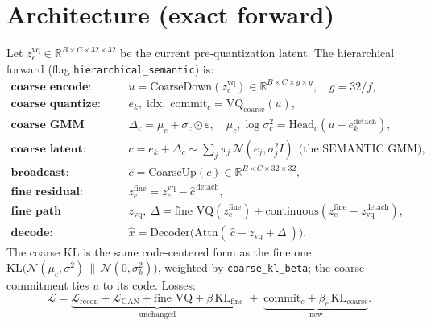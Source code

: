 \documentclass[11pt]{article}
\newcommand{\code}[1]{\texttt{#1}}
\begin{document}
\section{Architecture (exact forward)}
Let $z_e^{\text{vq}}\in\mathbb{R}^{B\times C\times 32\times 32}$ be the current pre-quantization latent.
The hierarchical forward (flag \code{hierarchical\_semantic}) is:
\begin{align}
\textbf{coarse encode:}\quad & u = \mathrm{CoarseDown}(z_e^{\text{vq}}) \in \mathbb{R}^{B\times C\times g\times g},\quad g=32/f,\\
\textbf{coarse quantize:}\quad & e_{k}, \;\text{idx},\;\text{commit}_c = \mathrm{VQ_{coarse}}(u),\\
\textbf{coarse GMM offset:}\quad & \Delta_c = \mu_c + \sigma_c\odot\varepsilon,\quad \mu_c,\log\sigma_c^2 = \mathrm{Head}_c(u-e_k^{\text{detach}}),\\
\textbf{coarse latent:}\quad & c = e_k + \Delta_c \sim \textstyle\sum_j \pi_j\,\mathcal{N}(e_j,\sigma_j^2 I)\ \ \text{(the SEMANTIC GMM)},\\
\textbf{broadcast:}\quad & \hat{c} = \mathrm{CoarseUp}(c) \in \mathbb{R}^{B\times C\times 32\times 32},\\
\textbf{fine residual:}\quad & z_e^{\text{fine}} = z_e^{\text{vq}} - \hat{c}^{\,\text{detach}},\\
\textbf{fine path (unchanged):}\quad & z_{\text{vq}},\ \Delta = \text{fine VQ}(z_e^{\text{fine}}) + \text{continuous}(z_e^{\text{fine}}-z_{\text{vq}}^{\text{detach}}),\\
\textbf{decode:}\quad & \hat{x} = \mathrm{Decoder}\big(\mathrm{Attn}(\ \hat{c} + z_{\text{vq}} + \Delta\ )\big).
\end{align}
The coarse KL is the same code-centered form as the fine one, $\mathrm{KL}\!\big(\mathcal{N}(\mu_c,\sigma^2)\,\|\,\mathcal{N}(0,\sigma_{k}^2)\big)$, weighted by \code{coarse\_kl\_beta}; the coarse commitment ties $u$ to its code. Losses:
\[
\mathcal{L} = \underbrace{\mathcal{L}_{\text{recon}} + \mathcal{L}_{\text{GAN}} + \text{fine VQ} + \beta\,\mathrm{KL}_{\text{fine}}}_{\text{unchanged}}
\;+\; \underbrace{\text{commit}_c + \beta_c\,\mathrm{KL}_{\text{coarse}}}_{\text{new}} .
\]
\end{document}
